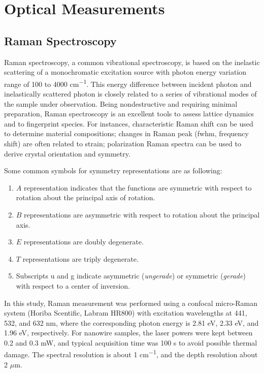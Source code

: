 \section{Optical Measurements}
\subsection{Raman Spectroscopy}

Raman spectroscopy, a common vibrational spectroscopy, is based on the inelastic scattering of a monochromatic excitation source with photon energy variation range of 100 to 4000 \si{cm^{-1}}. This energy difference between incident photon and inelastically scattered photon is closely related to a series of vibrational modes of the sample under observation. Being nondestructive and requiring minimal preparation, Raman spectroscopy is an excellent tools to assess lattice dynamics and to fingerprint species.\cite{McCreery2000} For instances, characteristic Raman shift can be used to determine material compositions; changes in Raman peak (\gls{fwhm}, frequency shift) are often related to strain; polarization Raman spectra can be used to derive crystal orientation and symmetry. 

Some common symbols for symmetry representations are as following:
\begin{enumerate}
\item $A$ representation indicates that the functions are symmetric with respect to rotation about the principal axis of rotation.
\item $B$ representations are asymmetric with respect to rotation about the principal axis.
\item $E$ representations are doubly degenerate.
\item $T$ representations are triply degenerate.
\item Subscripts u and g indicate asymmetric (\emph{ungerade}) or symmetric (\emph{gerade}) with respect to a center of inversion.
\end{enumerate}

In this study, Raman measurement was performed using a confocal micro-Raman system (Horiba Scentific, Labram HR800) with excitation wavelengths at 441, 532, and 632 nm, where the corresponding photon energy is 2.81 eV, 2.33 eV, and 1.96 eV, respectively. For nanowire samples, the laser powers were kept between 0.2 and 0.3 mW, and typical acquisition time was 100 s to avoid possible thermal damage. The spectral resolution is about 1 \si{cm^{-1}}, and the depth resolution about 2 $\mu$m.

